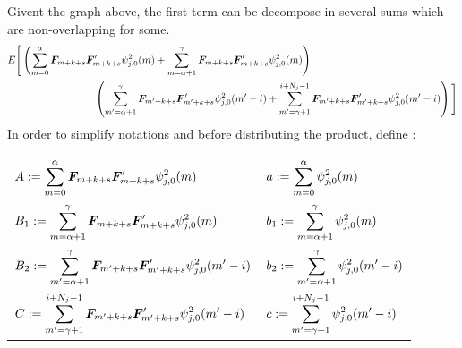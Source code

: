 \documentclass[main_document.tex]{subfiles}
\begin{document}
Givent the graph above, the first term can be decompose in several sums which are non-overlapping for some. 
\begin{align*}
	& E \Bigg[ \left( \sum_{m=0}^{\alpha} \factors{m+k+s}\factors{m+k+s}' \squaredWavelet{j}{0}{m} + \sum_{m=\alpha+1}^{\gamma} \factors{m+k+s}\factors{m+k+s}' \squaredWavelet{j}{0}{m} \right) \\ &
\hspace{3cm }\left( \sum_{m'=\alpha+1}^{\gamma} \factors{m'+k+s}\factors{m'+k+s}' \squaredWavelet{j}{0}{m'-i} + \sum_{m'=\gamma+1}^{i+N_j-1} \factors{m'+k+s}\factors{m'+k+s}' \squaredWavelet{j}{0}{m'-i} \right) \Bigg]
\end{align*}
In order to simplify notations and before distributing the product, define : 
\begin{center}
\begin{tabular}{p{9cm}|p{5cm}}
	$A := \sum_{m=0}^{\alpha} \factors{m+k+s}\factors{m+k+s}' \squaredWavelet{j}{0}{m}$ & $a := \sum_{m=0}^{\alpha} \squaredWavelet{j}{0}{m}$ \\
	$B_1 := \sum_{m=\alpha+1}^{\gamma} \factors{m+k+s}\factors{m+k+s}' \squaredWavelet{j}{0}{m}$ & $b_1 := \sum_{m=\alpha+1}^{\gamma} \squaredWavelet{j}{0}{m} $\\
	$B_2 := \sum_{m'=\alpha+1}^{\gamma} \factors{m'+k+s}\factors{m'+k+s}' \squaredWavelet{j}{0}{m'-i}$ & $b_2  := \sum_{m'=\alpha+1}^{\gamma} \squaredWavelet{j}{0}{m'-i}$\\
	$C := \sum_{m'=\gamma+1}^{i+N_j-1} \factors{m'+k+s}\factors{m'+k+s}' \squaredWavelet{j}{0}{m'-i}$ & $c := \sum_{m'=\gamma+1}^{i+N_j-1} \squaredWavelet{j}{0}{m'-i}$ 
\end{tabular}
\end{center}
\end{document}
